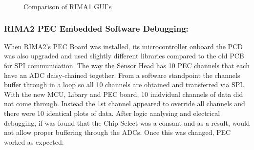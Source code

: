 \begin{figure}[htbp]
    \centering
    \hspace{0.5cm}
    \caption{Comparison of RIMA1 GUI's}
    \label{fig:r1gui}
\end{figure}
\newpage
{}

\subsubsection{RIMA2 PEC Embedded Software Debugging: }

When RIMA2's PEC Board was installed, its microcontroller onboard the PCD was also upgraded and used slightly different libraries compared to the old PCB for SPI communication. The way the Sensor Head has 10 PEC
channels that each have an ADC daisy-chained together. From a software standpoint the channels buffer through in a loop so all 10 channels are obtained and transferred via SPI. With the new MCU, Libary and PEC board,
10 inidvidual channels of data did not come through. Instead the 1st channel appeared to override all channels and there were 10 identical plots of data. After logic analysing and electrical debugging, if was found that 
the Chip Select was a consant and as a result, would not allow proper buffering through the ADCs. Once this was changed, PEC worked as expected.

